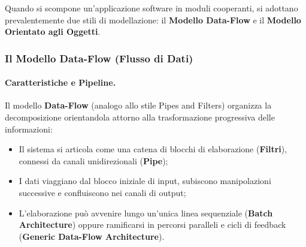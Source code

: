 \documentclass[12pt]{extarticle}
\begin{document}
\noindent Quando si scompone un'applicazione software in moduli cooperanti, si adottano prevalentemente due stili di modellazione: il \textbf{Modello Data-Flow} e il \textbf{Modello Orientato agli Oggetti}.

\subsubsection{Il Modello Data-Flow (Flusso di Dati)}

\paragraph{Caratteristiche e Pipeline.}
Il modello \textbf{Data-Flow} (analogo allo stile Pipes and Filters) organizza la decomposizione orientandola attorno alla trasformazione progressiva delle informazioni:
\begin{itemize}
    \item Il sistema si articola come una catena di blocchi di elaborazione (\textbf{Filtri}), connessi da canali unidirezionali (\textbf{Pipe});
    \item I dati viaggiano dal blocco iniziale di input, subiscono manipolazioni successive e confluiscono nei canali di output;
    \item L'elaborazione può avvenire lungo un'unica linea sequenziale (\textbf{Batch Architecture}) oppure ramificarsi in percorsi paralleli e cicli di feedback (\textbf{Generic Data-Flow Architecture}).
\end{itemize}
\end{document}

